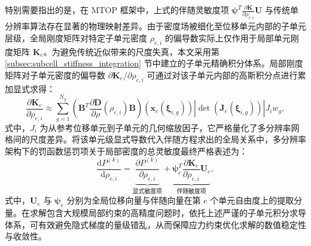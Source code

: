 特别需要指出的是，在 MTOP 框架中，上式的伴随灵敏度项 $\boldsymbol{\psi}^T \frac{\partial \boldsymbol{K}}{\partial\rho_{e,i}} \boldsymbol{U}$ 与传统单分辨率算法存在显著的物理映射差异。由于密度场被细化至位移单元内部的子单元层级，全局刚度矩阵对特定子单元密度 $\rho_{e,i}$ 的偏导数实际上仅作用于局部单元刚度矩阵 $\boldsymbol{K}_e$。为避免传统近似带来的尺度失真，本文采用第 \ref{subsec:subcell_stiffness_integration} 节中建立的子单元精确积分体系。局部刚度矩阵对子单元密度的偏导数 $\partial \boldsymbol{K}_e / \partial\rho_{e,i}$ 可通过对该子单元内部的高斯积分点进行累加显式求得：
\[
\frac{\partial \boldsymbol{K}_e}{\partial \rho_{e,i}} \approx \sum_{g=1}^{N_g} \left( \boldsymbol{B}^T \frac{\partial \boldsymbol{D}}{\partial \rho}(\rho_{e,i}) \boldsymbol{B} \right)(\boldsymbol{x}_e(\boldsymbol\xi_{i,g})) |\det(\boldsymbol{J}_e(\boldsymbol\xi_{i,g}))|J_iw_g,
\]
式中，$J_i$ 为从参考位移单元到子单元的几何缩放因子，它严格量化了多分辨率网格间的尺度差异。将该单元级显式导数代入伴随方程求出的全局关系中，多分辨率架构下的罚函数惩罚项关于局部密度的总灵敏度最终严格表述为：
\begin{equation} 
	\frac{\mathrm{d}P^{(k)}}{\mathrm{d}\rho_{e,i}} = \underbrace{\frac{\partial P^{(k)}}{\partial\rho_{e,i}}}_{\text{显式敏度项}} + \underbrace{\boldsymbol{\psi}_e^T \frac{\partial \boldsymbol{K}_e}{\partial\rho_{e,i}} \boldsymbol{U}_e}_{\text{伴随敏度项}},
	\label{eq:ch4_total_sensitivity}
\end{equation}
式中，$\boldsymbol{U}_e$ 与 $\boldsymbol{\psi}_e$ 分别为全局位移向量与伴随向量在第 $e$ 个单元自由度上的提取分量。在求解包含大规模局部约束的高精度问题时，依托上述严谨的子单元积分求导体系，可有效避免隐式梯度的量级错乱，从而保障应力约束优化求解的数值稳定性与收敛性。

